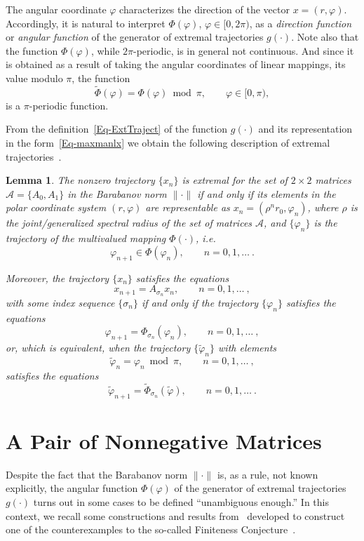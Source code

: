 \documentclass[a4paper,10pt,reqno]{amsart}
\let\cite\citep
\newtheorem{lemma}{Lemma}
\newcommand{\setA}{\mathscr{A}}
\begin{document}
The angular coordinate $\varphi$ characterizes the direction of the vector
$x=(r,\varphi)$. Accordingly, it is natural to interpret $\varPhi(\varphi)$,
$\varphi\in[0,2\pi)$, as a \emph{direction function} or \emph{angular
function} of the generator of extremal trajectories $g(\cdot)$. Note also
that the function $\varPhi(\varphi)$, while $2\pi$-periodic, is in general
not continuous. And since it is obtained as a result of taking the angular
coordinates of linear mappings, its value modulo $\pi$, the function
\begin{equation}\label{E:angfun}
\tilde{\varPhi}(\varphi)=\varPhi(\varphi)\bmod\pi,\qquad\varphi\in[0,\pi),
\end{equation}
is a $\pi$-periodic function.

\sloppy From the definition~\eqref{Eq-ExtTraject} of the function $g(\cdot)$
and its representation in the form~\eqref{Eq-maxmanlx} we obtain the
following description of extremal
trajectories~\cite[Lemma~6]{Koz:INFOPROC06:e}.

\fussy\begin{lemma}\label{L:Phimap} The nonzero trajectory $\{x_{n}\}$ is
extremal for the set of ${{2\times2}}$ matrices $\setA=\{A_{0},A_{1}\}$ in
the Barabanov norm $\|\cdot\|$ if and only if its elements in the polar
coordinate system $(r,\varphi)$ are representable as $x_{n}=(\rho^{n}
r_{0},\varphi_{n})$, where $\rho$ is the joint/generalized spectral radius of
the set of matrices $\setA$, and $\{\varphi_{n}\}$ is the trajectory of the
multivalued mapping $\varPhi(\cdot)$, i.e.
\[
\varphi_{n+1}\in \varPhi(\varphi_{n}),\qquad n=0,1,\ldots~.
\]

Moreover, the trajectory $\{x_{n}\}$ satisfies the equations
\[
x_{n+1}=A_{\sigma_{n}}x_{n},\qquad n=0,1,\ldots~,
\]
with some index sequence $\{\sigma_{n}\}$ if and only if the trajectory
$\{\varphi_{n}\}$ satisfies the equations
\[
\varphi_{n+1}=\varPhi_{\sigma_{n}}(\varphi_{n}),\qquad n=0,1,\ldots~,
\]
or, which is equivalent, when the trajectory $\{\tilde{\varphi}_{n}\}$ with
elements
\[
\tilde{\varphi}_{n}=\varphi_{n}\bmod\pi,\qquad n=0,1,\ldots~,
\]
satisfies the equations
\[
\tilde{\varphi}_{n+1}=\tilde{\varPhi}_{\sigma_{n}}(\tilde{\varphi}),\qquad
n=0,1,\ldots~.
\]
\end{lemma}

\section{A Pair of Nonnegative Matrices}\label{S:sturmian-case}
Despite the fact that the Barabanov norm $\|\cdot\|$ is, as a rule, not known
explicitly, the angular function $\varPhi(\varphi)$ of the generator of
extremal trajectories $g(\cdot)$ turns out in some cases to be defined
``unambiguous enough.'' In this context, we recall some constructions and
results from~\cite{Koz:INFOPROC05:e, Koz:INFOPROC06:e} developed to construct
one of the counterexamples to the so-called Finiteness
Conjecture~\cite{LagWang:LAA95, BM:JAMS02, BTV:SIAMJMA03}.
\end{document}

